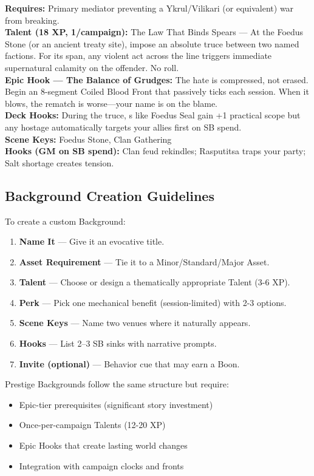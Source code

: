 \documentclass[12pt]{article}
\begin{document}
\begin{description}[leftmargin=*]
  \item[\textbf{Keeper of the Foedus Stone}] 
  \textbf{Requires:} Primary mediator preventing a Ykrul/Vilikari (or equivalent) war from breaking. \\
  \textbf{Talent (18 XP, 1/campaign):} The Law That Binds Spears — At the Foedus Stone (or an ancient treaty site), impose an absolute truce between two named factions. For its span, any violent act across the line triggers immediate supernatural calamity on the offender. No roll. \\
  \textbf{Epic Hook — The Balance of Grudges:} The hate is compressed, not erased. Begin an 8-segment Coiled Blood Front that passively ticks each session. When it blows, the rematch is worse—your name is on the blame. \\
  \textbf{Deck Hooks:} During the truce, s like Foedus Seal gain +1 practical scope but any hostage automatically targets your allies first on SB spend. \\
  \textbf{Scene Keys:} Foedus Stone, Clan Gathering \\
  \textbf{Hooks (GM on SB spend):} Clan feud rekindles; Rasputitsa traps your party; Salt shortage creates tension.

\end{description}

\subsection*{Background Creation Guidelines}

To create a custom Background:
\begin{enumerate}
  \item \textbf{Name It} — Give it an evocative title.
  \item \textbf{Asset Requirement} — Tie it to a Minor/Standard/Major Asset.
  \item \textbf{Talent} — Choose or design a thematically appropriate Talent (3-6 XP).
  \item \textbf{Perk} — Pick one mechanical benefit (session-limited) with 2-3 options.
  \item \textbf{Scene Keys} — Name two venues where it naturally appears.
  \item \textbf{Hooks} — List 2–3 SB sinks with narrative prompts.
  \item \textbf{Invite (optional)} — Behavior cue that may earn a Boon.
\end{enumerate}

Prestige Backgrounds follow the same structure but require:
\begin{itemize}
  \item Epic-tier prerequisites (significant story investment)
  \item Once-per-campaign Talents (12-20 XP)
  \item Epic Hooks that create lasting world changes
  \item Integration with campaign clocks and fronts
\end{itemize}
\end{document}
